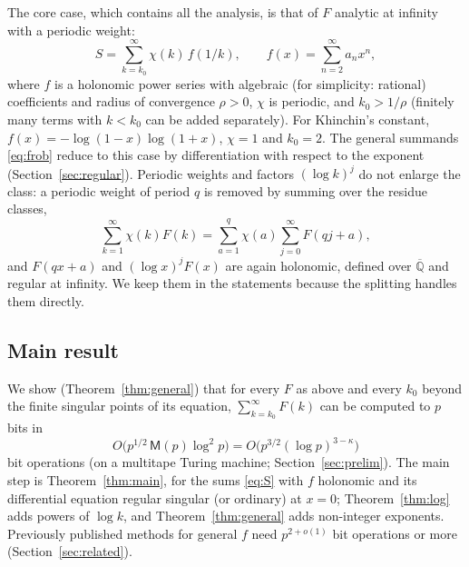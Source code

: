 \documentclass[11pt]{amsart}
\theoremstyle{definition}
\theoremstyle{remark}
\newcommand{\Qbar}{\overline{\mathbb{Q}}}
\newcommand{\Mul}{\mathsf{M}}
\begin{document}
The core case, which contains all the analysis, is that of $F$ analytic at infinity with a periodic weight:
\begin{equation}\label{eq:S}
  S = \sum_{k=k_0}^{\infty} \chi(k)\, f(1/k), \qquad f(x) = \sum_{n=2}^{\infty} a_n x^n,
\end{equation}
where $f$ is a holonomic power series with algebraic (for simplicity: rational) coefficients and radius of
convergence $\rho > 0$, $\chi$ is periodic, and $k_0 > 1/\rho$ (finitely many terms with $k < k_0$ can be added
separately). For Khinchin's constant, $f(x) = -\log(1-x)\log(1+x)$, $\chi = 1$ and $k_0 = 2$. The general
summands \eqref{eq:frob} reduce to this case by differentiation with respect to the exponent
(Section~\ref{sec:regular}). Periodic weights and factors $(\log k)^j$ do not enlarge the class: a periodic
weight of period $q$ is removed by summing over the residue classes,
\[
  \sum_{k=1}^{\infty} \chi(k)F(k) = \sum_{a=1}^{q}\chi(a)\sum_{j=0}^{\infty} F(qj+a),
\]
and $F(qx+a)$ and $(\log x)^jF(x)$ are again
holonomic, defined over $\Qbar$ and regular at infinity. We keep them in the statements because the splitting
handles them directly.

\subsection{Main result}
We show (Theorem~\ref{thm:general}) that for every $F$ as above and every $k_0$ beyond the finite singular
points of its equation, $\sum_{k=k_0}^{\infty}F(k)$ can be computed to $p$ bits in
\[
  O\bigl(p^{1/2}\, \Mul(p) \log^2 p\bigr) = O\bigl(p^{3/2}(\log p)^{3-\kappa}\bigr)
\]
bit operations (on a multitape Turing machine; Section~\ref{sec:prelim}). The main step is Theorem~\ref{thm:main}, for the sums \eqref{eq:S} with $f$ holonomic and its
differential equation regular singular (or ordinary) at $x = 0$; Theorem~\ref{thm:log} adds powers of
$\log k$, and Theorem~\ref{thm:general} adds non-integer exponents. Previously published methods for general $f$
need $p^{2+o(1)}$ bit operations or more (Section~\ref{sec:related}).
\end{document}
